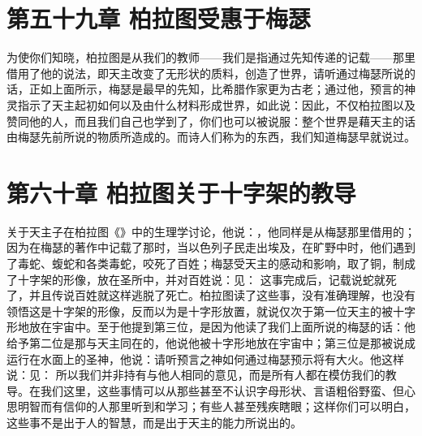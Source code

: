 
\section{第五十九章 柏拉图受惠于梅瑟}

为使你们知晓，柏拉图是从我们的教师——我们是指通过先知传递的记载——那里借用了他的说法，即天主改变了无形状的质料，创造了世界，请听通过梅瑟所说的话，正如上面所示，梅瑟是最早的先知，比希腊作家更为古老；通过他，预言的神灵指示了天主起初如何以及由什么材料形成世界，如此说：因此，不仅柏拉图以及赞同他的人，而且我们自己也学到了，你们也可以被说服：整个世界是藉天主的话由梅瑟先前所说的物质所造成的。而诗人们称为的东西，我们知道梅瑟早就说过。\par


\section{第六十章 柏拉图关于十字架的教导}

关于天主子在柏拉图《》中的生理学讨论，他说：，他同样是从梅瑟那里借用的；因为在梅瑟的著作中记载了那时，当以色列子民走出埃及，在旷野中时，他们遇到了毒蛇、蝮蛇和各类毒蛇，咬死了百姓；梅瑟受天主的感动和影响，取了铜，制成了十字架的形像，放在圣所中，并对百姓说：见： 这事完成后，记载说蛇就死了，并且传说百姓就这样逃脱了死亡。柏拉图读了这些事，没有准确理解，也没有领悟这是十字架的形像，反而以为是十字形放置，就说仅次于第一位天主的被十字形地放在宇宙中。至于他提到第三位，是因为他读了我们上面所说的梅瑟的话：他给予第二位是那与天主同在的，他说他被十字形地放在宇宙中；第三位是那被说成运行在水面上的圣神，他说：请听预言之神如何通过梅瑟预示将有大火。他这样说：见： 所以我们并非持有与他人相同的意见，而是所有人都在模仿我们的教导。在我们这里，这些事情可以从那些甚至不认识字母形状、言语粗俗野蛮、但心思明智而有信仰的人那里听到和学习；有些人甚至残疾瞎眼；这样你们可以明白，这些事不是出于人的智慧，而是出于天主的能力所说出的。\par

